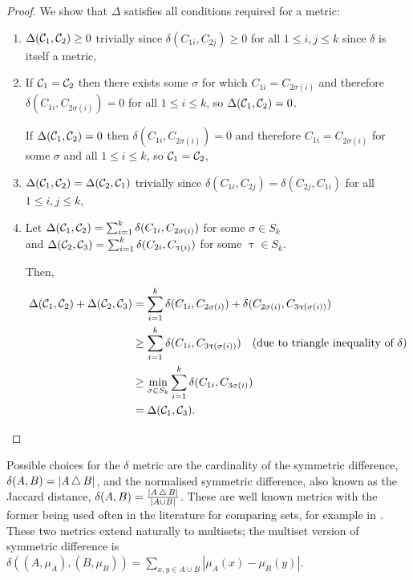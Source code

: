 \begin{proof}
  We show that $\Delta$ satisfies all conditions required for a metric:
  \begin{enumerate}
  \item $\Delta(\mathcal{C}_1, \mathcal{C}_2) \geq 0$ trivially since
    $\delta(C_{1i}, C_{2j}) \geq 0$ for all $1 \leq i,j \leq k$ since
    $\delta$ is itself a metric,
  \item If $\mathcal{C}_1 = \mathcal{C}_2$ then there exists some $\sigma$ for which
    $C_{1i} = C_{2\sigma(i)}$ and therefore $\delta(C_{1i},
    C_{2\sigma(i)}) = 0$ for all $1 \leq i \leq k$, so $\Delta(\mathcal{C}_1,
    \mathcal{C}_2) = 0$.

    If $\Delta(\mathcal{C}_1, \mathcal{C}_2) = 0$ then $\delta(C_{1i},
    C_{2\sigma(i)}) = 0$ and therefore $C_{1i} = C_{2\sigma(i)}$ for
    some $\sigma$ and all $1 \leq i \leq k$, so $\mathcal{C}_1 = \mathcal{C}_2$,
  \item $\Delta(\mathcal{C}_1, \mathcal{C}_2) = \Delta(\mathcal{C}_2, \mathcal{C}_1)$
    trivially since $\delta(C_{1i}, C_{2j}) = \delta(C_{2j}, C_{1i})$
    for all $1 \leq i,j \leq k$,
  \item Let $\Delta(\mathcal{C}_1, \mathcal{C}_2) = \sum_{i=1}^{k} \delta(C_{1i},
    C_{2\sigma(i)})$ for
    some $\sigma \in S_k$\\
    and $\Delta(\mathcal{C}_2, \mathcal{C}_3) = \sum_{i=1}^{k} \delta(C_{2i},
    C_{\uptau(i)})$ for some $\uptau \in S_k$.
    
    Then,
    \vspace{-1em}
    \begin{align*}
      \Delta(\mathcal{C}_1, \mathcal{C}_2) + \Delta(\mathcal{C}_2, \mathcal{C}_3) &=
      \sum_{i=1}^{k} \delta(C_{1i},
      C_{2\sigma(i)}) + \delta(C_{2\sigma(i)}, C_{3\uptau(\sigma(i))})\\
      &\geq \sum_{i=1}^{k} \delta(C_{1i},
      C_{3\uptau(\sigma(i))})\quad\text{(due to
        triangle inequality of $\delta$)}\\
      &\geq \min_{\sigma \in S_k} \sum_{i=1}^{k} \delta(C_{1i}, C_{3\sigma(i)})\\
      &= \Delta(\mathcal{C}_1, \mathcal{C}_3).
    \end{align*}
  \end{enumerate}
\end{proof}

Possible choices for the $\delta$ metric are the cardinality of the symmetric
difference, $\delta(A,B) = |A \operatorname{\bigtriangleup} B|$, and the normalised symmetric
difference, also known as the Jaccard distance, $\delta(A,B) = \frac{|A
  \operatorname{\bigtriangleup} B|}{|A \cup B|}$.  These are well known metrics with the former
being used often in the literature for comparing sets, for example in
\cite{reynolds2006clustering}.  These two metrics extend naturally to
multisets; the multiset version of symmetric difference is
$\delta((A,\mu_A),(B,\mu_B)) = \sum_{x,y \in A \cup B} |\mu_A(x)-\mu_B(y)|$.

